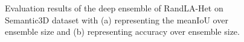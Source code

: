     \begin{figure}[htbp]
        \begin{subfigure}{0.495\textwidth}
            
            \caption{}
            \label{fig:meaniou_de}   
        \end{subfigure}
        \begin{subfigure}{0.495\textwidth}
            
            \caption{}
            \label{fig:acc_de}
        \end{subfigure}
        \caption{Evaluation results of the deep ensemble of RandLA-Het on Semantic3D dataset with (a) representing the meanIoU over ensemble size and (b) representing accuracy over ensemble size.}
    \end{figure}

 

